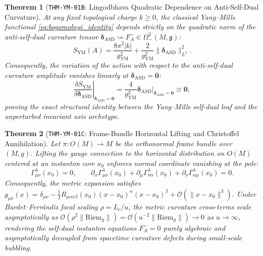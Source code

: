 \documentclass[11pt,a4paper,reqno]{article}
\theoremstyle{plain}
\newtheorem{theorem}{Theorem}[section]
\theoremstyle{definition}
\theoremstyle{remark}
\numberwithin{equation}{section}
\begin{document}
\begin{theorem}[\texttt{THM-YM-01B}: Lingodbhava Quadratic Dependence on Anti-Self-Dual Curvature]
\label{thm:ym_even_parity}
At any fixed topological charge $k \ge 0$, the classical Yang--Mills functional \eqref{eq:bogomolnyi_identity} depends strictly on the quadratic norm of the anti-self-dual curvature tensor $\bm{\delta}_{\mathrm{ASD}} \coloneqq F_A^- \in \Omega^2_-(M, \mathfrak{g})$:
\begin{equation}
  S_{\mathrm{YM}}(A) = \frac{8\pi^2 |k|}{g_{\mathrm{YM}}^2} + \frac{2}{g_{\mathrm{YM}}^2} \|\bm{\delta}_{\mathrm{ASD}}\|_{L^2}^2.
\end{equation}
Consequently, the variation of the action with respect to the anti-self-dual curvature amplitude vanishes linearly at $\bm{\delta}_{\mathrm{ASD}} = \mathbf{0}$:
\begin{equation}
  \left. \frac{\delta S_{\mathrm{YM}}}{\delta \bm{\delta}_{\mathrm{ASD}}} \right|_{\bm{\delta}_{\mathrm{ASD}} = \mathbf{0}} = \frac{4}{g_{\mathrm{YM}}^2} \bm{\delta}_{\mathrm{ASD}} \Bigg|_{\bm{\delta}_{\mathrm{ASD}} = \mathbf{0}} \equiv \mathbf{0},
\end{equation}
proving the exact structural identity between the Yang--Mills self-dual leaf and the unperturbed invariant axis archetype.
\end{theorem}

\begin{theorem}[\texttt{THM-YM-01C}: Frame-Bundle Horizontal Lifting and Christoffel Annihilation]
\label{thm:ym_frame_bundle}
Let $\pi: O(M) \to M$ be the orthonormal frame bundle over $(M, g)$. Lifting the gauge connection to the horizontal distribution on $O(M)$ centered at an instanton core $x_0$ enforces normal coordinate vanishing at the pole:
\begin{equation}
  \Gamma_{\mu\nu}^\lambda(x_0) = 0, \qquad \partial_\alpha \Gamma_{\mu\nu}^\lambda(x_0) + \partial_\mu \Gamma_{\nu\alpha}^\lambda(x_0) + \partial_\nu \Gamma_{\alpha\mu}^\lambda(x_0) = 0.
\end{equation}
Consequently, the metric expansion satisfies $g_{\mu\nu}(x) = \delta_{\mu\nu} - \frac{1}{3} R_{\mu\alpha\nu\beta}(x_0) (x-x_0)^\alpha (x-x_0)^\beta + \mathcal{O}(\|x-x_0\|^3)$. Under Burdet--Ferr\'{a}ndiz focal scaling $\rho = L_c/u$, the metric curvature cross-terms scale asymptotically as $\mathcal{O}(\rho^2 \|\mathrm{Riem}_g\|) = \mathcal{O}(u^{-2} \|\mathrm{Riem}_g\|) \to 0$ as $u \to \infty$, rendering the self-dual instanton equations $F_A^- = 0$ purely algebraic and asymptotically decoupled from spacetime curvature defects during small-scale bubbling.
\end{theorem}
\end{document}
